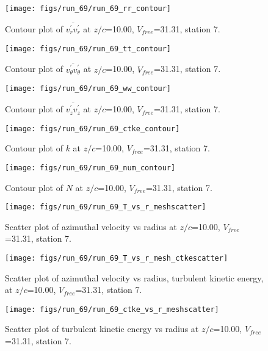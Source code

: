 \begin{figure}[H]
\centering
\texttt{[image: figs/run\_69/run\_69\_rr\_contour]}
\caption{Contour plot of $\overline{v_{r}^{\prime} v_{r}^{\prime}}$ at $z/c$=10.00, $V_{free}$=31.31, station 7.}
\end{figure}


\begin{figure}[H]
\centering
\texttt{[image: figs/run\_69/run\_69\_tt\_contour]}
\caption{Contour plot of $\overline{v_{\theta}^{\prime} v_{\theta}^{\prime}}$ at $z/c$=10.00, $V_{free}$=31.31, station 7.}
\end{figure}


\begin{figure}[H]
\centering
\texttt{[image: figs/run\_69/run\_69\_ww\_contour]}
\caption{Contour plot of $\overline{v_{z}^{\prime} v_{z}^{\prime}}$ at $z/c$=10.00, $V_{free}$=31.31, station 7.}
\end{figure}


\begin{figure}[H]
\centering
\texttt{[image: figs/run\_69/run\_69\_ctke\_contour]}
\caption{Contour plot of $k$ at $z/c$=10.00, $V_{free}$=31.31, station 7.}
\end{figure}


\begin{figure}[H]
\centering
\texttt{[image: figs/run\_69/run\_69\_num\_contour]}
\caption{Contour plot of $N$ at $z/c$=10.00, $V_{free}$=31.31, station 7.}
\end{figure}


\begin{figure}[H]
\centering
\texttt{[image: figs/run\_69/run\_69\_T\_vs\_r\_meshscatter]}
\caption{Scatter plot of azimuthal velocity vs radius at $z/c$=10.00, $V_{free}$=31.31, station 7.}
\end{figure}


\begin{figure}[H]
\centering
\texttt{[image: figs/run\_69/run\_69\_T\_vs\_r\_mesh\_ctkescatter]}
\caption{Scatter plot of azimuthal velocity vs radius, turbulent kinetic energy, at $z/c$=10.00, $V_{free}$=31.31, station 7.}
\end{figure}


\begin{figure}[H]
\centering
\texttt{[image: figs/run\_69/run\_69\_ctke\_vs\_r\_meshscatter]}
\caption{Scatter plot of turbulent kinetic energy vs radius at $z/c$=10.00, $V_{free}$=31.31, station 7.}
\end{figure}



